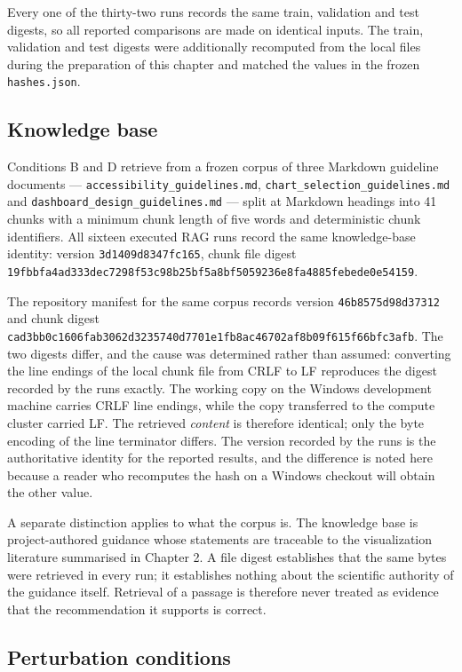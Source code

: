 Every one of the thirty-two runs records the same train, validation and test digests, so all reported comparisons are made on identical inputs. The train, validation and test digests were additionally recomputed from the local files during the preparation of this chapter and matched the values in the frozen \texttt{hashes.json}.

\subsection{Knowledge base}

Conditions B and D retrieve from a frozen corpus of three Markdown guideline documents --- \nolinkurl{accessibility_guidelines.md}, \nolinkurl{chart_selection_guidelines.md} and \nolinkurl{dashboard_design_guidelines.md} --- split at Markdown headings into 41 chunks with a minimum chunk length of five words and deterministic chunk identifiers. All sixteen executed RAG runs record the same knowledge-base identity: version \texttt{3d1409d8347fc165}, chunk file digest \nolinkurl{19fbbfa4ad333dec7298f53c98b25bf5a8bf5059236e8fa4885febede0e54159}.

The repository manifest for the same corpus records version \texttt{46b8575d98d37312} and chunk digest \nolinkurl{cad3bb0c1606fab3062d3235740d7701e1fb8ac46702af8b09f615f66bfc3afb}. The two digests differ, and the cause was determined rather than assumed: converting the line endings of the local chunk file from CRLF to LF reproduces the digest recorded by the runs exactly. The working copy on the Windows development machine carries CRLF line endings, while the copy transferred to the compute cluster carried LF. The retrieved \emph{content} is therefore identical; only the byte encoding of the line terminator differs. The version recorded by the runs is the authoritative identity for the reported results, and the difference is noted here because a reader who recomputes the hash on a Windows checkout will obtain the other value.

A separate distinction applies to what the corpus is. The knowledge base is project-authored guidance whose statements are traceable to the visualization literature summarised in Chapter 2. A file digest establishes that the same bytes were retrieved in every run; it establishes nothing about the scientific authority of the guidance itself. Retrieval of a passage is therefore never treated as evidence that the recommendation it supports is correct.

\subsection{Perturbation conditions}

